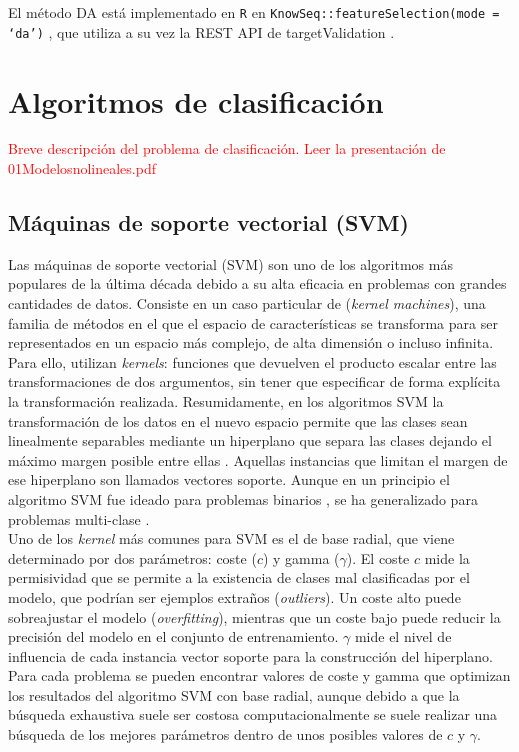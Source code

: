 El método DA  está implementado en \texttt{R}  en \texttt{KnowSeq::featureSelection(mode = `da')} \cite{KnowSeq}, que utiliza a su vez la REST API de targetValidation \cite{OpenTargets2020}.

\section{Algoritmos de clasificación}

\textcolor{red}{Breve descripción del problema de clasificación. Leer la presentación de 01Modelosnolineales.pdf}

\subsection{Máquinas de soporte vectorial (SVM)}

Las máquinas de soporte vectorial (SVM) son uno de los algoritmos más populares de la última década debido a su alta eficacia en problemas con grandes cantidades de datos. Consiste en un caso particular de (\textit{kernel machines}), una familia de métodos en el que el espacio de características se transforma para ser representados en un espacio más complejo, de alta dimensión o incluso infinita. Para ello, utilizan \textit{kernels}: funciones que devuelven el producto escalar entre las transformaciones de dos argumentos, sin tener que especificar de forma explícita la transformación realizada. Resumidamente, en los algoritmos SVM la transformación de los datos en el nuevo espacio permite que las clases sean linealmente separables mediante un hiperplano que separa las clases dejando el máximo margen posible entre ellas \cite{Boser1992}. Aquellas instancias que limitan el margen de ese hiperplano son llamados vectores soporte. Aunque en un principio el algoritmo SVM fue ideado para problemas binarios \cite{Boser1992}, se ha generalizado para problemas multi-clase \cite{Duan2005}.\\

Uno de los \textit{kernel} más comunes para SVM es el de base radial, que viene determinado por dos parámetros: coste ($c$) y gamma ($\gamma$). El coste $c$ mide la permisividad que se permite a la existencia de clases mal clasificadas por el modelo, que podrían ser ejemplos extraños (\textit{outliers}). Un coste alto puede sobreajustar el modelo (\textit{overfitting}), mientras que un coste bajo puede reducir la precisión del modelo en el conjunto de entrenamiento. $\gamma$ mide el nivel de influencia de cada instancia vector soporte para la construcción del hiperplano. Para cada problema se pueden encontrar valores de coste y gamma que optimizan los resultados del algoritmo SVM con base radial, aunque debido a que la búsqueda exhaustiva suele ser costosa computacionalmente se suele realizar una búsqueda de los mejores parámetros dentro de unos posibles valores de $c$ y $\gamma$.\\

